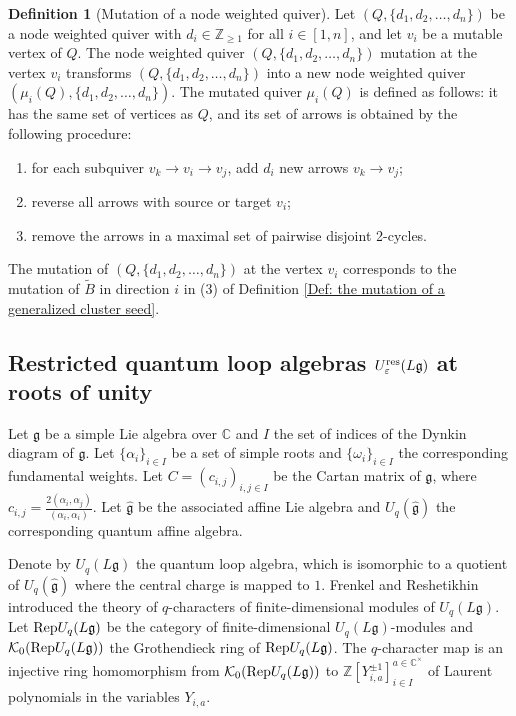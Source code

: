 \documentclass[11pt, reqno]{amsart}
\theoremstyle{plain}
\theoremstyle{definition}
\newtheorem{definition}[theorem]{Definition}
\numberwithin{equation}{section}
\newcommand{\res}{{\rm res}}
\begin{document}
\begin{definition} [{Mutation of a node weighted quiver}] \label{Def: quiver mutation}
Let $(Q, \{d_1,d_2,\ldots,d_n\})$ be a node weighted quiver with $d_i\in \mathbb{Z}_{\ge 1}$ for all $i\in[1,n]$, and let $v_i$ be a mutable vertex of $Q$. The node weighted quiver $(Q, \{d_1, d_2, \ldots, d_n\})$ mutation at the vertex $v_i$ transforms $(Q, \{d_1, d_2, \ldots, d_n\})$ into a new node weighted quiver $(\mu_i(Q), \{d_1, d_2, \ldots, d_n\} )$. The mutated quiver $\mu_i(Q)$ is defined as follows: it has the same set of vertices as $Q$, and its set of arrows is obtained by the following procedure:
 \begin{enumerate}
     \item for each subquiver $v_k\rightarrow v_i\rightarrow v_j$, add $d_i$ new arrows $v_k \rightarrow v_j$; 
     \item reverse all arrows with source or target $v_i$;
     \item remove the arrows in a maximal set of pairwise disjoint 2-cycles.
 \end{enumerate}
\end{definition}
The mutation of $(Q, \{d_1,d_2,\ldots,d_n\})$ at the vertex $v_i$ corresponds to the mutation of $\widetilde{B}$ in direction $i$ in (3) of Definition \ref{Def: the mutation of a generalized cluster seed}. 
 

\subsection{Restricted quantum loop algebras \texorpdfstring{$U_\varepsilon^{\res}({L\mathfrak{g}})$}{ of type A} at roots of unity}
Let $\mathfrak{g}$ be a simple Lie algebra over $\mathbb{C}$ and $I$ the set of indices of the Dynkin diagram of $\mathfrak{g}$. Let $\{\alpha_i\}_{i \in I}$ be a set of simple roots and $\{\omega_i\}_{i \in I}$ the corresponding fundamental weights. Let $C=(c_{i,j})_{i,j \in I}$ be the Cartan matrix of $\mathfrak{g}$, where $c_{i,j}=\frac{2 (\alpha_i, \alpha_j) }{(\alpha_i, \alpha_i)}$. Let $\mathfrak{\widehat{g}}$ be the associated affine Lie algebra and $U_q(\widehat{\mathfrak{g}})$ the corresponding quantum affine algebra.


Denote by $U_q(L \mathfrak{g})$ the quantum loop algebra, which is isomorphic to a quotient of $U_q(\widehat{\mathfrak{g}})$ where the central charge is mapped to $1$. Frenkel and Reshetikhin \cite{FR98} introduced the theory of $q$-characters of finite-dimensional modules of $U_q(L \mathfrak{g})$. Let ${\rm Rep} U_{q}(L{\mathfrak{g}})$ be the category of finite-dimensional $U_q (L{\mathfrak{g}})$-modules and $\mathcal{K}_0({\rm Rep} U_{q}(L{\mathfrak{g}}))$ the Grothendieck ring of ${\rm Rep} U_{q}(L{\mathfrak{g}})$. The $q$-character map is an injective ring homomorphism from $\mathcal{K}_0({\rm Rep} U_{q}(L{\mathfrak{g}}))$ to $\mathbb{Z}[Y_{i,a}^{\pm1}]_{i \in I}^{a\in\mathbb{C^{\times}}}$ of Laurent polynomials in the variables $Y_{i,a}$.
\end{document}
